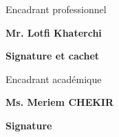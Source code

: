 \thispagestyle{empty}

\begin{center}
    \begin{minipage}[l]{1\columnwidth}
        \begin{tcolorbox}[colback=white,boxrule=2pt,arc=10pt,height=105mm]{
            \vspace{2cm}
            \vspace{1mm}
            \begin{center}
                \Large
                Encadrant professionnel
                
                \textbf{Mr. Lotfi Khaterchi}
            \end{center}
            \vspace{5mm}
            \hspace{0.68\columnwidth}\textbf{\large Signature et cachet}
        }
        \end{tcolorbox}
    \end{minipage}
    
    \vspace{2cm}
    
    \begin{minipage}[l]{1\columnwidth}
        \begin{tcolorbox}[colback=white,boxrule=2pt,arc=10pt,height=105mm]{
            \vspace{2cm}
            \large 
            \vspace{1mm}
            \begin{center}
                \Large
                Encadrant académique
                
                \textbf{Ms. Meriem CHEKIR}
            \end{center}
            \vspace{5mm}
            \hspace{0.68\columnwidth}\textbf{\large Signature}
        }
        \end{tcolorbox}
    \end{minipage}
\end{center}